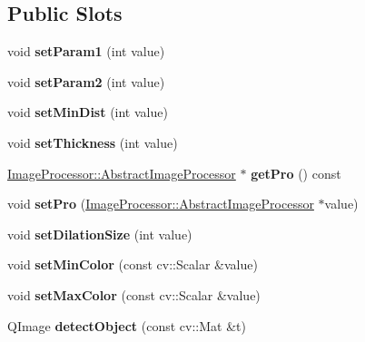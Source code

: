 \subsection*{Public Slots}
\begin{DoxyCompactItemize}
\item 
\mbox{\label{class_color_detector_controller_a12cef009b075aee19592b6f9d5bf4d08}} 
void {\bfseries set\+Param1} (int value)
\item 
\mbox{\label{class_color_detector_controller_a3a383fee14bb11464f077843fbef6ef3}} 
void {\bfseries set\+Param2} (int value)
\item 
\mbox{\label{class_color_detector_controller_aa2d6bc51226ab600bd98a272f4578eea}} 
void {\bfseries set\+Min\+Dist} (int value)
\item 
\mbox{\label{class_color_detector_controller_a9e740e8277b4a20331073f06dc21c2b3}} 
void {\bfseries set\+Thickness} (int value)
\item 
\mbox{\label{class_color_detector_controller_af0a3dc83cc160531856e27f2e33bbadb}} 
\hyperlink{class_image_processor_1_1_abstract_image_processor}{Image\+Processor\+::\+Abstract\+Image\+Processor} $\ast$ {\bfseries get\+Pro} () const
\item 
\mbox{\label{class_color_detector_controller_a1be625213c4974eef58e7563c1df0973}} 
void {\bfseries set\+Pro} (\hyperlink{class_image_processor_1_1_abstract_image_processor}{Image\+Processor\+::\+Abstract\+Image\+Processor} $\ast$value)
\item 
\mbox{\label{class_color_detector_controller_acf885c6d9cc0c81601143d678bb9f890}} 
void {\bfseries set\+Dilation\+Size} (int value)
\item 
\mbox{\label{class_color_detector_controller_a7bcd481a9b607e2078a68d51158868a7}} 
void {\bfseries set\+Min\+Color} (const cv\+::\+Scalar \&value)
\item 
\mbox{\label{class_color_detector_controller_ac143c0f40e57336aac8a05f6d6148d12}} 
void {\bfseries set\+Max\+Color} (const cv\+::\+Scalar \&value)
\item 
\mbox{\label{class_color_detector_controller_afbf3737d1542b0e1517621b90b7efe15}} 
Q\+Image {\bfseries detect\+Object} (const cv\+::\+Mat \&t)
\end{DoxyCompactItemize}
